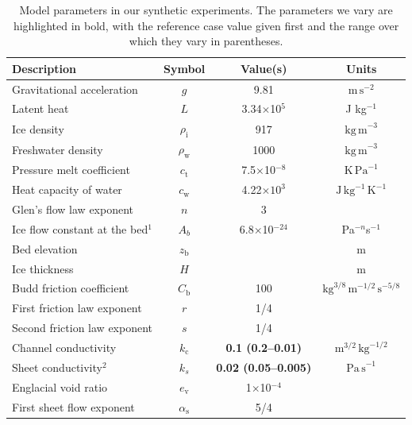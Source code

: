 \documentclass[tc, manuscript]{copernicus}
\begin{document}
\begin{table}[t]
\caption{Model parameters in our synthetic experiments. The parameters we vary are highlighted in bold, with the reference case value given first and the range over which they vary in parentheses.}
\label{tab:Synth}
\begin{tabular}{@{\,\,\,}l@{\,\,\,}c@{\,\,\,}c@{\,\,\,}c@{\,\,\,}}

\hline
Description & Symbol & Value(s) & Units \\
\hline
Gravitational acceleration & $g$ & 9.81 & $\mathrm{m\, s}^{-2}$ \\
Latent heat & $L$ & 3.34$\times$10$^{5}$ & J kg$^{-1}$ \\
Ice density & $\rho_{\mathrm{i}}$ & 917 & $\mathrm{kg\, m}^{-3}$ \\
Freshwater density & $\rho_{\mathrm{w}}$ & 1000 & $\mathrm{kg\, m}^{-3}$ \\
Pressure melt coefficient & $c_{\mathrm{t}}$ & 7.5$\times$10$^{-8}$ & $\mathrm{K\, Pa}^{-1}$ \\
Heat capacity of water & $c_{\mathrm{w}}$ & 4.22$\times10^{3}$ & $\mathrm{J\, kg}^{-1}\, \mathrm{K}^{-1}$ \\
Glen's flow law exponent & $n$ & 3 & \hfill \\
Ice flow constant at the bed$^{1}$ & $A_{b}$ & 6.8$\times$10$^{-24}$ & Pa$^{-n}$s$^{-1}$ \\
Bed elevation & $z_{\mathrm{b}}$ & \hfill & m \\
Ice thickness & $H$ & \hfill & m \\
Budd friction coefficient & $C_{\mathrm{b}}$ & 100 & $\mathrm{kg}^{3/8}\,\mathrm{m}^{-1/2}\,\mathrm{s}^{-5/8}$\\ 
First friction law exponent & $r$ & 1/4 & \hfill \\
Second friction law exponent & $s$ & 1/4 & \hfill \\
Channel conductivity & $k_{\mathrm{c}}$ & \textbf{0.1 (0.2--0.01)} & $\mathrm{m}^{3/2}\, \mathrm{kg}^{-1/2}$ \\
Sheet conductivity$^{2}$ & $k_{s}$ & \textbf{0.02 (0.05--0.005)} & $\mathrm{Pa\, s}^{-1}$ \\
Englacial void ratio & $e_{\mathrm{v}}$ & 1$\times$10$^{-4}$ & \hfill \\
First sheet flow exponent & $\alpha_{\mathrm{s}}$ & 5/4 & \hfill \\

\end{tabular}
\end{table}
\end{document}
